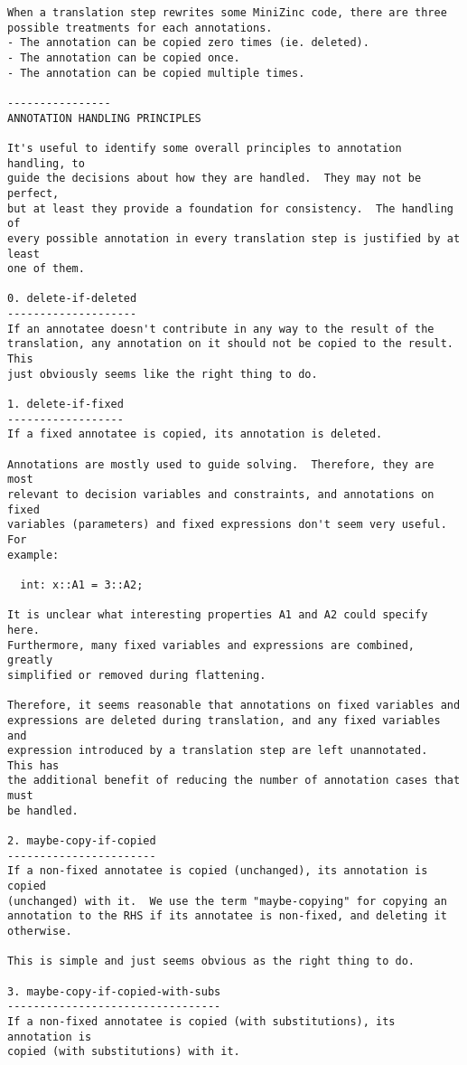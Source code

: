 \documentclass[10pt]{article}
\begin{document}
\begin{verbatim}
When a translation step rewrites some MiniZinc code, there are three
possible treatments for each annotations.
- The annotation can be copied zero times (ie. deleted).
- The annotation can be copied once.
- The annotation can be copied multiple times.

----------------
ANNOTATION HANDLING PRINCIPLES

It's useful to identify some overall principles to annotation handling, to
guide the decisions about how they are handled.  They may not be perfect,
but at least they provide a foundation for consistency.  The handling of
every possible annotation in every translation step is justified by at least
one of them.

0. delete-if-deleted
--------------------
If an annotatee doesn't contribute in any way to the result of the
translation, any annotation on it should not be copied to the result.  This
just obviously seems like the right thing to do.  

1. delete-if-fixed 
------------------
If a fixed annotatee is copied, its annotation is deleted.

Annotations are mostly used to guide solving.  Therefore, they are most
relevant to decision variables and constraints, and annotations on fixed
variables (parameters) and fixed expressions don't seem very useful.  For
example:

  int: x::A1 = 3::A2;

It is unclear what interesting properties A1 and A2 could specify here.
Furthermore, many fixed variables and expressions are combined, greatly
simplified or removed during flattening.  

Therefore, it seems reasonable that annotations on fixed variables and
expressions are deleted during translation, and any fixed variables and
expression introduced by a translation step are left unannotated.  This has
the additional benefit of reducing the number of annotation cases that must
be handled.

2. maybe-copy-if-copied
-----------------------
If a non-fixed annotatee is copied (unchanged), its annotation is copied
(unchanged) with it.  We use the term "maybe-copying" for copying an
annotation to the RHS if its annotatee is non-fixed, and deleting it
otherwise.

This is simple and just seems obvious as the right thing to do.

3. maybe-copy-if-copied-with-subs
---------------------------------
If a non-fixed annotatee is copied (with substitutions), its annotation is
copied (with substitutions) with it.


\end{verbatim}
\end{document}
